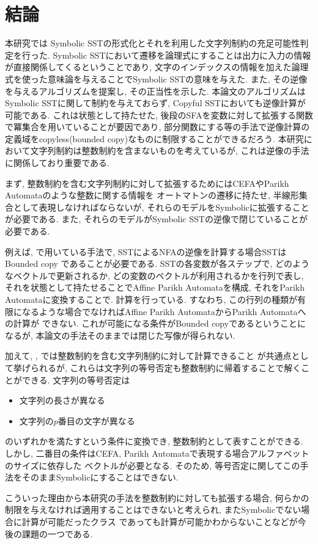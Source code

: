 \documentclass[uplatex,dvipdfmx,a4j]{jsreport}
\begin{document}
  \chapter{結論}  \label{chap:conclusion}

  本研究では Symbolic SSTの形式化とそれを利用した文字列制約の充足可能性判定を行った.
  Symbolic SSTにおいて遷移を論理式にすることは出力に入力の情報が直接関係してくるということであり,
  文字のインデックスの情報を加えた論理式を使った意味論を与えることでSymbolic SSTの意味を与えた.
  また, その逆像を与えるアルゴリズムを提案し, その正当性を示した.
  本論文のアルゴリズムはSymbolic SSTに関して制約を与えておらず, Copyful SSTにおいても逆像計算が可能である.
  これは状態として持たせた, 後段のSFAを変数に対して拡張する関数で冪集合を用いていることが要因であり,
  部分関数にする等の手法で逆像計算の定義域をcopyless(bounded copy)なものに制限することができるだろう.
  本研究において文字列制約は整数制約を含まないものを考えているが, これは逆像の手法に関係しており重要である.

  まず, 整数制約を含む文字列制約に対して拡張するためにはCEFAやParikh Automataのような整数に関する情報を
  オートマトンの遷移に持たせ, 半線形集合として表現しなければならないが, それらのモデルをSymbolicに拡張することが必要である.
  また, それらのモデルがSymbolic SSTの逆像で閉じていることが必要である.

  例えば, \cite{kamano2021solver}で用いている手法で, SSTによるNFAの逆像を計算する場合SSTはBounded copy
  であることが必要である.
  SSTの各変数が各ステップで, どのようなベクトルで更新されるか, どの変数のベクトルが利用されるかを行列で表し,
  それを状態として持たせることでAffine Parikh Automataを構成, それをParikh Automataに変換することで.
  計算を行っている.
  すなわち, この行列の種類が有限になるような場合でなければAffine Parikh AutomataからParikh Automataへの計算が
  できない.
  これが可能になる条件がBounded copyであるということになるが, 本論文の手法そのままでは閉じた写像が得られない.

  加えて, \cite{chen2020decision}, \cite{kamano2021solver}では整数制約を含む文字列制約に対して計算できること
  が共通点として挙げられるが, これらは文字列の等号否定も整数制約に帰着することで解くことができる.
  文字列の等号否定は
  \begin{itemize}
    \item 文字列の長さが異なる
    \item 文字列の$p$番目の文字が異なる
  \end{itemize}
  のいずれかを満たすという条件に変換でき, 整数制約として表すことができる.
  しかし, 二番目の条件はCEFA, Parikh Automataで表現する場合アルファベットのサイズに依存した
  ベクトルが必要となる.
  そのため, 等号否定に関してこの手法をそのままSymbolicにすることはできない.

  こういった理由から本研究の手法を整数制約に対しても拡張する場合,
  何らかの制限を与えなければ適用することはできないと考えられ, またSymbolicでない場合に計算が可能だったクラス
  であっても計算が可能かわからないことなどが今後の課題の一つである.
\end{document}
